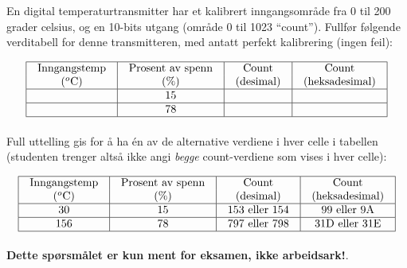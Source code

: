 
En digital temperaturtransmitter har et kalibrert inngangsområde fra 0 til 200 grader celsius, og en 10-bits utgang (område 0 til 1023 ``count''). Fullfør følgende verditabell for denne transmitteren, med antatt perfekt kalibrering (ingen feil):


$$\vbox{\offinterlineskip
\halign{\strut
\vrule \quad\hfil # \ \hfil & 
\vrule \quad\hfil # \ \hfil & 
\vrule \quad\hfil # \ \hfil & 
\vrule \quad\hfil # \ \hfil \vrule \cr
\noalign{\hrule}
%
Inngangstemp & Prosent av spenn & Count & Count \cr
%
($^{o}$C) & (\%) & (desimal) & (heksadesimal) \cr
%
\noalign{\hrule}
%
 & 15 &  &  \cr
%
\noalign{\hrule}
%
 & 78 &  &  \cr
%
\noalign{\hrule}
} %
}$$ %







Full uttelling gis for å ha én av de alternative verdiene i hver celle i tabellen (studenten trenger altså ikke angi {\it begge} count-verdiene som vises i hver celle):


$$\vbox{\offinterlineskip
\halign{\strut
\vrule \quad\hfil # \ \hfil & 
\vrule \quad\hfil # \ \hfil & 
\vrule \quad\hfil # \ \hfil & 
\vrule \quad\hfil # \ \hfil \vrule \cr
\noalign{\hrule}
%
Inngangstemp & Prosent av spenn & Count & Count \cr
%
($^{o}$C) & (\%) & (desimal) & (heksadesimal) \cr
%
\noalign{\hrule}
%
30 & 15 & 153 eller 154 & 99 eller 9A \cr
%
\noalign{\hrule}
%
156 & 78 & 797 eller 798 & 31D eller 31E \cr
%
\noalign{\hrule}
} %
}$$ %







{\bf Dette spørsmålet er kun ment for eksamen, ikke arbeidsark!}.

